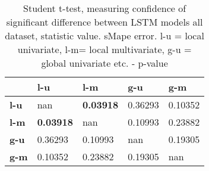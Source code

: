 \begin{table}[H]
\centering
\caption{Student t-test, measuring confidence of significant difference between LSTM models all dataset, statistic value. sMape error.  l-u = local univariate, l-m= local multivariate, g-u = global univariate etc. - p-value}
\label{table:ttest-p-values-lstm-experiments-sMAPE-all-dataset}
\begin{tabular}{lllll}
\toprule
{} &               l-u &               l-m &      g-u &      g-m \\
\midrule
\textbf{l-u} &               nan &  \textbf{0.03918} &  0.36293 &  0.10352 \\
\textbf{l-m} &  \textbf{0.03918} &               nan &  0.10993 &  0.23882 \\
\textbf{g-u} &           0.36293 &           0.10993 &      nan &  0.19305 \\
\textbf{g-m} &           0.10352 &           0.23882 &  0.19305 &      nan \\
\bottomrule
\end{tabular}
\end{table}
